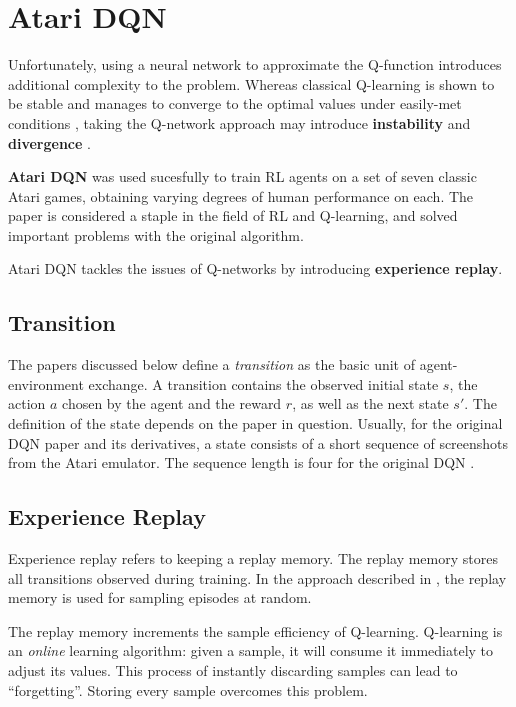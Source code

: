 \section{Atari DQN}

Unfortunately, using a neural network to approximate the Q-function introduces additional complexity to the problem.
Whereas classical Q-learning is shown to be stable and manages to converge to the optimal values under easily-met conditions \cite{atari-dqn},
taking the Q-network approach may introduce \textbf{instability} and \textbf{divergence} \cite{long-peak-rl}.

\textbf{Atari DQN} \cite{atari-dqn} was used sucesfully to train RL agents on a set of seven classic Atari games, obtaining varying degrees of human performance on each.
The paper is considered a staple in the field of RL and Q-learning, and solved important problems with the original algorithm.

Atari DQN tackles the issues of Q-networks by introducing 
\textbf{experience replay}.

\subsection{Transition}

The papers discussed below define a \emph{transition} as the basic unit of agent-environment exchange.
A transition contains the observed initial state \(s\), the action \(a\) chosen by the agent and the reward \(r\), as well as the next state \(s'\). The definition of the state depends on the paper in question.
Usually, for the original DQN paper and its derivatives, a state consists of a short sequence of screenshots from the Atari emulator. The sequence length is four for the original DQN \cite{atari-dqn}.

\subsection{Experience Replay}

Experience replay refers to keeping a replay memory.
The replay memory stores all transitions observed during training.
In the approach described in \cite{atari-dqn}, the replay memory is used for sampling episodes at random.

The replay memory increments the sample efficiency of Q-learning.
Q-learning is an \emph{online} learning algorithm: given a sample, it will consume it immediately to adjust its values.
This process of instantly discarding samples can lead to ``forgetting''.
Storing every sample overcomes this problem.

